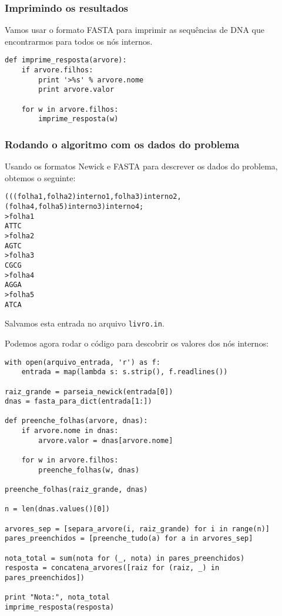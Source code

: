 \documentclass[11pt]{article}
\begin{document}
\subsubsection{Imprimindo os resultados}
\label{sec-4-3-4}

Vamos usar o formato FASTA para imprimir as sequências de DNA que
encontrarmos para todos os nós internos.

\begin{verbatim}
def imprime_resposta(arvore):
    if arvore.filhos:
        print '>%s' % arvore.nome
        print arvore.valor

    for w in arvore.filhos:
        imprime_resposta(w)
\end{verbatim}


\subsubsection{Rodando o algoritmo com os dados do problema}
\label{sec-4-3-5}

Usando os formatos Newick e FASTA para descrever os dados do problema,
obtemos o seguinte:

\begin{verbatim}
(((folha1,folha2)interno1,folha3)interno2,(folha4,folha5)interno3)interno4;
>folha1
ATTC
>folha2
AGTC
>folha3
CGCG
>folha4
AGGA
>folha5
ATCA
\end{verbatim}

Salvamos esta entrada no arquivo \verb~livro.in~.

Podemos agora rodar o código para descobrir os valores dos nós internos:

\begin{verbatim}
with open(arquivo_entrada, 'r') as f:
    entrada = map(lambda s: s.strip(), f.readlines())

raiz_grande = parseia_newick(entrada[0])
dnas = fasta_para_dict(entrada[1:])

def preenche_folhas(arvore, dnas):
    if arvore.nome in dnas:
        arvore.valor = dnas[arvore.nome]

    for w in arvore.filhos:
        preenche_folhas(w, dnas)

preenche_folhas(raiz_grande, dnas)

n = len(dnas.values()[0])

arvores_sep = [separa_arvore(i, raiz_grande) for i in range(n)]
pares_preenchidos = [preenche_tudo(a) for a in arvores_sep]

nota_total = sum(nota for (_, nota) in pares_preenchidos)
resposta = concatena_arvores([raiz for (raiz, _) in pares_preenchidos])

print "Nota:", nota_total
imprime_resposta(resposta)
\end{verbatim}
\end{document}
